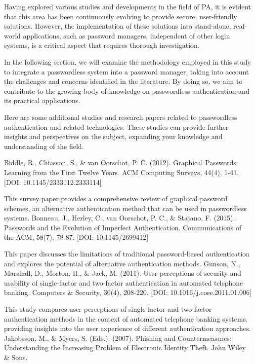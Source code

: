Having explored various studies and developments in the field of PA, it is
evident that this area has been continuously evolving to provide secure,
user-friendly solutions.
However, the implementation of these solutions into stand-alone, real-world
applications, such as password managers, independent of other login systems, is
a critical aspect that requires thorough investigation.

In the following section, we will examine the methodology employed in this
study to integrate a passwordless system into a password manager,
taking into account the challenges and concerns identified in the literature.
By doing so, we aim to contribute to the growing body of knowledge on
passwordless authentication and its practical applications.


\iffalse
Here are some additional studies and research papers related to passwordless authentication and related technologies. These studies can provide further insights and perspectives on the subject, expanding your knowledge and understanding of the field.

Biddle, R., Chiasson, S., & van Oorschot, P. C. (2012). Graphical Passwords: Learning from the First Twelve Years. ACM Computing Surveys, 44(4), 1-41. [DOI: 10.1145/2333112.2333114]

This survey paper provides a comprehensive review of graphical password schemes, an alternative authentication method that can be used in passwordless systems.
Bonneau, J., Herley, C., van Oorschot, P. C., & Stajano, F. (2015). Passwords and the Evolution of Imperfect Authentication. Communications of the ACM, 58(7), 78-87. [DOI: 10.1145/2699412]

This paper discusses the limitations of traditional password-based authentication and explores the potential of alternative authentication methods.
Gunson, N., Marshall, D., Morton, H., & Jack, M. (2011). User perceptions of security and usability of single-factor and two-factor authentication in automated telephone banking. Computers & Security, 30(4), 208-220. [DOI: 10.1016/j.cose.2011.01.006]

This study compares user perceptions of single-factor and two-factor authentication methods in the context of automated telephone banking systems, providing insights into the user experience of different authentication approaches.
Jakobsson, M., & Myers, S. (Eds.). (2007). Phishing and Countermeasures: Understanding the Increasing Problem of Electronic Identity Theft. John Wiley & Sons.

